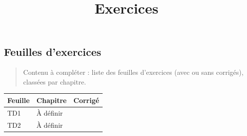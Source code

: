 \documentclass[
  french,
  12pt,
]{article}
\title{Exercices}
\author{}
\date{}
\newcounter{none} %
\begin{document}
\maketitle


\subsection{Feuilles d'exercices}\label{feuilles-dexercices}

\begin{quote}
Contenu à compléter : liste des feuilles d'exercices (avec ou sans
corrigés), classées par chapitre.
\end{quote}

{\def\LTcaptype{none} %
\begin{longtable}[]{@{}lll@{}}
\toprule\noalign{}
Feuille & Chapitre & Corrigé \\
\midrule\noalign{}
\endhead
\bottomrule\noalign{}
\endlastfoot
TD1 & À définir & \\
TD2 & À définir & \\
\end{longtable}
}
\end{document}
